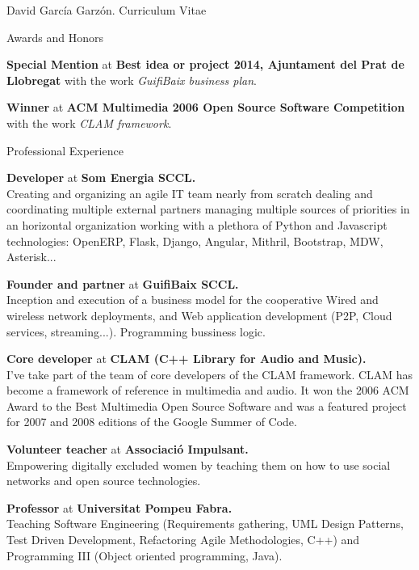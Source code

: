 \documentclass{article}
\begin{document}
\begin{cv}{David García Garzón. Curriculum Vitae}
\begin{cvlist}{Awards and Honors}
\item[2014]
{\bf Special Mention}
at {\bf Best idea or project 2014, Ajuntament del Prat de Llobregat}
with the work {\em GuifiBaix business plan}.
\item[2006]
{\bf Winner}
at {\bf ACM Multimedia 2006 Open Source Software Competition}
with the work {\em CLAM framework}.
\end{cvlist}

\begin{cvlist}{Professional Experience}

\item[Jan 2015-Nov 2024]
{\bf Developer} at
{\bf Som Energia SCCL.}\\
Creating and organizing an agile IT team nearly from scratch
dealing and coordinating multiple external partners
managing multiple sources of priorities in an horizontal organization
working with a plethora of Python and Javascript technologies:
OpenERP, Flask, Django, Angular, Mithril, Bootstrap, MDW, Asterisk...


\item[Jun 2013-Now]
{\bf Founder and partner} at
{\bf GuifiBaix SCCL.}\\
Inception and execution of a business model for the cooperative
Wired and wireless network deployments, and
Web application development (P2P, Cloud services, streaming...).
Programming bussiness logic.


\item[Jan 2000-Now]
{\bf Core developer} at
{\bf CLAM (C++ Library for Audio and Music).}\\
I've take part of the team of core developers of the CLAM framework.
CLAM has become a framework of reference in multimedia and audio.
It won the 2006 ACM Award to the Best Multimedia Open Source Software
and was a featured project for 2007 and 2008 editions of the Google Summer of Code.


\item[Jan 2013-Jun 2013]
{\bf Volunteer teacher} at
{\bf Associació Impulsant.}\\
Empowering digitally excluded women by teaching them on how to use social networks and open source technologies.


\item[Sep 2002-Sep 2012]
{\bf Professor} at
{\bf Universitat Pompeu Fabra.}\\
Teaching Software Engineering (Requirements gathering, UML
Design Patterns, Test Driven Development, Refactoring
Agile Methodologies, C++) and
Programming III (Object oriented programming, Java).



\end{cvlist}
\end{cv}
\end{document}

